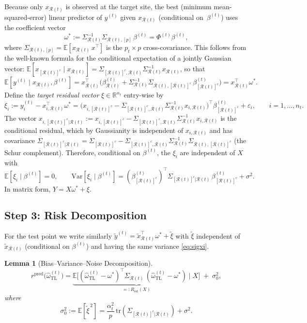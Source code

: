 \documentclass[11pt]{article}
\newtheorem{lemma}[theorem]{Lemma}
\theoremstyle{definition}
\newcommand{\Rt}{\mathcal{R}(t)}
\newcommand{\Rtc}{[\mathcal{R}(t)]^c}
\newcommand{\Sig}{\Sigma}
\newcommand{\SigR}{\Sigma_{\Rt}}
\newcommand{\SigRc}{\Sigma_{\Rtc}}
\newcommand{\SigRRc}{\Sigma_{\Rt,\Rtc}}
\newcommand{\SigRcR}{\Sigma_{\Rtc,\Rt}}
\newcommand{\SigSchur}{\Sigma_{\Rtc|\Rt}}
\newcommand{\ohat}{\hat{\omega}}
\newcommand{\E}{\mathbb{E}}
\newcommand{\tr}{\mathrm{tr}}
\newcommand{\Var}{\mathrm{Var}}
\newcommand{\R}{\mathbb{R}}
\begin{document}
Because only $x_{\Rt}$ is observed at the target site, the best
(minimum mean-squared-error) linear predictor of $y^{(t)}$ given
$x_{\Rt}$ (conditional on~$\beta^{(t)}$) uses the coefficient vector
\begin{equation}\label{eq:omega_star}
  \omega^*:=\SigR^{-1}\Sig_{\Rt,[p]}\,\beta^{(t)}
  =\Phi^{(t)}\beta^{(t)},
\end{equation}
where $\Sig_{\Rt,[p]}=\E[x_{\Rt}\,x^\top]$ is the $p_t\times p$
cross-covariance.  This follows from the well-known formula for the
conditional expectation of a jointly Gaussian vector:
$\E[x_{\Rtc}\mid x_{\Rt}]
=\SigRcR\SigR^{-1}x_{\Rt}$, so that
\[
  \E[y^{(t)}\mid x_{\Rt},\beta^{(t)}]
  =x_{\Rt}^\top
  \bigl(\beta^{(t)}_{\Rt}
  +\SigR^{-1}\SigRRc\,\beta^{(t)}_{\Rtc}\bigr)
  =x_{\Rt}^\top\omega^*.
\]
Define the \emph{target residual vector}
$\xi\in\R^{n_t}$ entry-wise by
\begin{equation}\label{eq:xi}
  \xi_i := y_i^{(t)}-x_{i,\Rt}^\top\omega^*
  =\bigl(x_{i,\Rtc}-\SigRcR\SigR^{-1}x_{i,\Rt}\bigr)^\top
    \beta^{(t)}_{\Rtc}+\varepsilon_i,
  \qquad i=1,\dots,n_t.
\end{equation}
The vector
$x_{i,\Rtc|\Rt}:=x_{i,\Rtc}-\SigRcR\SigR^{-1}x_{i,\Rt}$
is the conditional residual, which by Gaussianity is independent of
$x_{i,\Rt}$ and has covariance
$\SigSchur=\SigRc-\SigRcR\SigR^{-1}\SigRRc$
(the Schur complement).  Therefore, conditional on $\beta^{(t)}$,
the $\xi_i$ are independent of $X$ with
\begin{equation}\label{eq:sigxi}
  \E[\xi_i\mid\beta^{(t)}]=0,
  \qquad
  \Var[\xi_i\mid\beta^{(t)}]
  =(\beta^{(t)}_{\Rtc})^\top\SigSchur\,\beta^{(t)}_{\Rtc}
  +\sigma^2.
\end{equation}
In matrix form, $Y=X\omega^*+\xi$.
 
\subsection{Step 3: Risk Decomposition}\label{sec:step3}
 
For the test point we write similarly
$\tilde y^{(t)}=\tilde x_{\Rt}^\top\omega^*+\tilde\xi$
with $\tilde\xi$ independent of $\tilde x_{\Rt}$ (conditional on
$\beta^{(t)}$) and having the same variance
\eqref{eq:sigxi}.
 
\begin{lemma}[Bias--Variance--Noise Decomposition]\label{lem:decomp}
\begin{equation}\label{eq:decomp}
  r^{\mathrm{pred}}\!\bigl(\ohat_{\mathrm{TL}}^{(t)}\bigr)
  =\underbrace{\E\!\bigl[
      (\ohat_{\mathrm{TL}}^{(t)}-\omega^*)^\top
      \SigR\,
      (\ohat_{\mathrm{TL}}^{(t)}-\omega^*)
    \;\big|\;X\bigr]}_{\displaystyle=:R_{\mathrm{est}}(X)}
  \;+\;\sigma_0^2,
\end{equation}
where
\begin{equation}\label{eq:sig0}
  \sigma_0^2
  :=\E[\tilde\xi^{\,2}]
  =\frac{\alpha_t^2}{p}\,\tr(\SigSchur)+\sigma^2.
\end{equation}
\end{lemma}
 
\end{document}
